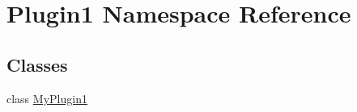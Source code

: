 \hypertarget{namespace_plugin1}{\section{Plugin1 Namespace Reference}
\label{namespace_plugin1}
}
\subsection*{Classes}
\begin{DoxyCompactItemize}
\item 
class \hyperlink{class_plugin1_1_1_my_plugin1}{My\-Plugin1}
\end{DoxyCompactItemize}
